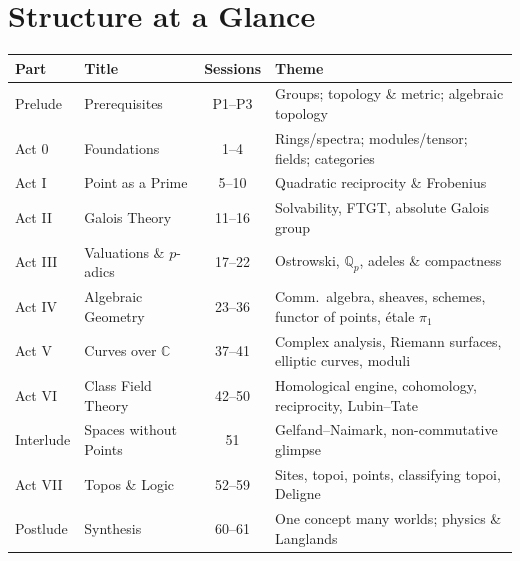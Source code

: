 \documentclass[11pt,a4paper]{article}
\newcommand{\Q}{\mathbb{Q}}
\newcommand{\C}{\mathbb{C}}
\begin{document}
	\section*{Structure at a Glance}
	\begin{center}
		\begin{tabular}{|l|l|c|p{6cm}|}
			\hline
			\textbf{Part} & \textbf{Title} & \textbf{Sessions} & \textbf{Theme} \\
			\hline
			Prelude & Prerequisites & P1--P3 & Groups; topology \& metric; algebraic topology \\
			Act 0 & Foundations & 1--4 & Rings/spectra; modules/tensor; fields; categories \\
			Act I & Point as a Prime & 5--10 & Quadratic reciprocity \& Frobenius \\
			Act II & Galois Theory & 11--16 & Solvability, FTGT, absolute Galois group \\
			Act III & Valuations \& $p$-adics & 17--22 & Ostrowski, $\Q_p$, adeles \& compactness \\
			Act IV & Algebraic Geometry & 23--36 & Comm.\ algebra, sheaves, schemes, functor of points, \'etale $\pi_1$ \\
			Act V & Curves over $\C$ & 37--41 & Complex analysis, Riemann surfaces, elliptic curves, moduli \\
			Act VI & Class Field Theory & 42--50 & Homological engine, cohomology, reciprocity, Lubin--Tate \\
			Interlude & Spaces without Points & 51 & Gelfand--Naimark, non-commutative glimpse \\
			Act VII & Topos \& Logic & 52--59 & Sites, topoi, points, classifying topoi, Deligne \\
			Postlude & Synthesis & 60--61 & One concept many worlds; physics \& Langlands \\
			\hline
		\end{tabular}
	\end{center}
	
\end{document}
